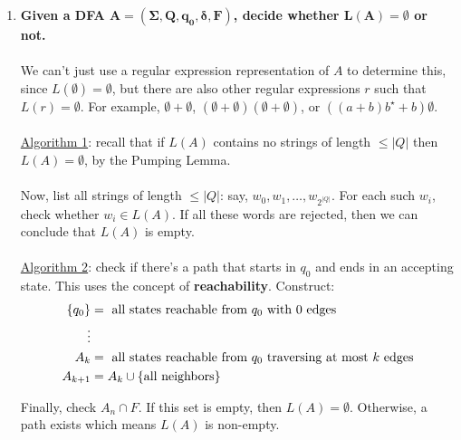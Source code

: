 \documentclass[]{article}
\DeclarePairedDelimiter{\set}{\lbrace}{\rbrace}
\theoremstyle{definition}
\begin{document}
\begin{enumerate}
          \item \textbf{Given a DFA $\boldsymbol{A = (\Sigma, Q, q_0, \delta, F)}$, decide whether $\boldsymbol{L(A) = \emptyset}$ or not.}
          \\ \\
          We can't just use a regular expression representation of $A$ to determine this, since $L(\emptyset) = \emptyset$, but there are also other regular expressions $r$ such that $L(r) = \emptyset$. For example, $\emptyset + \emptyset$, $(\emptyset + \emptyset)(\emptyset + \emptyset)$, or $((a + b)b^\star + b)\emptyset$.
          \\ \\
          \underline{Algorithm 1}: recall that if $L(A)$ contains no strings of length $\le |Q|$ then $L(A) = \emptyset$, by the Pumping Lemma.
          \\ \\
          Now, list all strings of length $\le |Q|$: say, $w_0, w_1, \ldots, w_{2^{|Q|}}$. For each such $w_i$, check whether $w_i \in L(A)$. If all these words are rejected, then we can conclude that $L(A)$ is empty.
          \\ \\
          \underline{Algorithm 2}: check if there's a path that starts in $q_0$ and ends in an accepting state. This uses the concept of \textbf{reachability}. Construct:
          \begin{align*}
            \set{q_0} &= \text{ all states reachable from } q_0 \text{ with 0 edges} \\
            \vdots & \\
            A_k &= \text{ all states reachable from } q_0 \text{ traversing at most } k \text{ edges} \\
            A_{k + 1} &= A_k \cup \set{ \text{all neighbors}}
          \end{align*}

          Finally, check $A_n \cap F$. If this set is empty, then $L(A) = \emptyset$. Otherwise, a path exists which means $L(A)$ is non-empty.


\end{enumerate}
\end{document}
